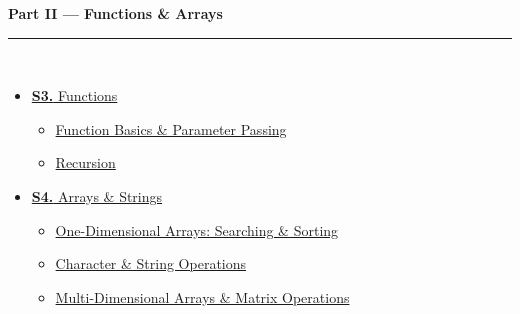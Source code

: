 \documentclass[12pt,a3paper]{article}
\begin{document}
\begin{tcolorbox}[breakable,colback=cB!5,colframe=cB,boxrule=1pt,arc=5pt,
  left=8pt,right=8pt,top=8pt,bottom=8pt,before skip=4pt]
  {\large\bfseries\textcolor{cB}{Part II --- Functions \& Arrays}}\\[5pt]
  \textcolor{cB!40}{\rule{\textwidth}{0.4pt}}\\[3pt]
  \small\begin{itemize}[leftmargin=1.2em,itemsep=1pt,label={\textcolor{cB}{$\triangleright$}}]
    \item \hyperref[sec:S3]{\textbf{S3.} Functions}
      \begin{itemize}[leftmargin=1.5em,itemsep=0pt,label={\textcolor{cB}{$\cdot$}}]
        \item \hyperref[sub:s3-funcbasics]{Function Basics \& Parameter Passing}
        \item \hyperref[sub:s3-recursion]{Recursion}
      \end{itemize}
    \item \hyperref[sec:S4]{\textbf{S4.} Arrays \& Strings}
      \begin{itemize}[leftmargin=1.5em,itemsep=0pt,label={\textcolor{cB}{$\cdot$}}]
        \item \hyperref[sub:s4-1darray]{One-Dimensional Arrays: Searching \& Sorting}
        \item \hyperref[sub:s4-strings]{Character \& String Operations}
        \item \hyperref[sub:s4-2darray]{Multi-Dimensional Arrays \& Matrix Operations}
      \end{itemize}
  \end{itemize}
\end{tcolorbox}
\end{document}
